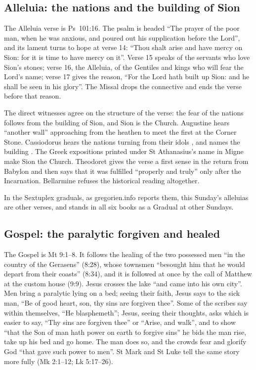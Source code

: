 \subsection{Alleluia: the nations and the building of Sion}

The Alleluia verse is Ps~101:16. The psalm is headed ``The prayer of the poor
man, when he was anxious, and poured out his supplication before the Lord'',
and its lament turns to hope at verse 14: ``Thou shalt arise and have mercy on
Sion: for it is time to have mercy on it''. Verse 15 speaks of the servants who
love Sion's stones; verse 16, the Alleluia, of the Gentiles and kings who will
fear the Lord's name; verse 17 gives the reason, ``For the Lord hath built up
Sion: and he shall be seen in his glory''. The Missal drops the connective
 and ends the verse before that reason.

The direct witnesses agree on the structure of the verse: the fear of the
nations follows from the building of Sion, and Sion is the Church. Augustine
hears ``another wall'' approaching from the heathen to meet the first at the
Corner Stone. Cassiodorus hears the nations turning from their idols
, and names the building . The Greek expositions printed under St Athanasius's name
in Migne make Sion the Church. Theodoret gives the verse a first sense in the
return from Babylon and then says that it was fulfilled ``properly and truly''
only after the Incarnation. Bellarmine refuses the historical reading
altogether.

In the Sextuplex graduals, as gregorien.info reports them, this Sunday's
alleluias are other verses, and  stands in all six
books as a Gradual at other Sundays.

\subsection{Gospel: the paralytic forgiven and healed}

The Gospel is Mt 9:1--8. It follows the healing of the two possessed men ``in
the country of the Gerasens'' (8:28), whose townsmen ``besought him that he
would depart from their coasts'' (8:34), and it is followed at once by the call of Matthew
at the custom house (9:9). Jesus crosses the lake ``and came into his own
city''. Men bring a paralytic lying on a bed; seeing their faith, Jesus says to
the sick man, ``Be of good heart, son, thy sins are forgiven thee''. Some of
the scribes say within themselves, ``He blasphemeth''; Jesus, seeing their
thoughts, asks which is easier to say, ``Thy sins are forgiven thee'' or
``Arise, and walk'', and to show ``that the Son of man hath power on earth to
forgive sins'' he bids the man rise, take up his bed and go home. The man
does so, and the crowds fear and glorify God ``that gave such power to men''.
St Mark and St Luke tell the same story more fully (Mk 2:1--12; Lk 5:17--26).

